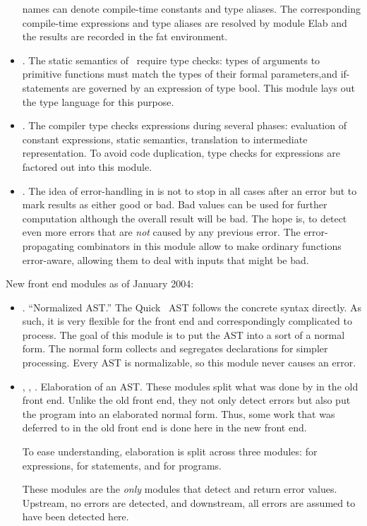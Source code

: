 \documentclass{article}%
\begin{document}
\begin{itemize}
{\PAL} names can denote compile-time constants and type aliases. The
corresponding compile-time expressions and type aliases are resolved by
module {\Tt{}Elab\nwendquote} and the results are recorded in the fat environment.

\item {}. The static semantics of \C~require type
checks:  types of arguments to primitive functions must match the types
of their formal parameters,and {\Tt{}if\nwendquote}-statements are governed by an
expression of type {\Tt{}bool\nwendquote}.  This module lays out the type language for
this purpose.
 
\item {}. The {\qcc} compiler type checks {\AST}
expressions during several phases: evaluation of constant expressions,
static semantics, translation to intermediate representation.  To avoid
code duplication, type checks for expressions are factored out into this
module.

\item {}. The idea of error-handling in {\qcc} is not
to stop in all cases after an error but to mark results as either good
or bad.  Bad values can be used for further computation although the
overall result will be bad.  The hope is, to detect even more errors
that are \textit{not} caused by any previous error. The
error-propagating combinators in this module allow to make ordinary
functions error-aware, allowing them to deal with inputs that might be
bad.

\end{itemize}

New front end modules as of January 2004:
\begin{itemize}
\item
{}.
``Normalized AST.''
The Quick~{\PAL} AST follows the concrete syntax directly.
As such, it is very flexible for the front end and correspondingly
complicated to process.
The goal of this module is to put the AST into a sort of a normal
form.
The normal form collects and segregates declarations for simpler
processing.
Every AST is normalizable, so this module never causes an error.
\item
{},
,
.
Elaboration of an AST.
These modules split what was done by  in the old
front end.
Unlike the old front end, they not only detect errors but also put the
program into an elaborated normal form.
Thus, some work that was deferred to  in the old
front end is done here in the new front end.

To ease understanding, elaboration is split across three modules:
 for expressions,
 for statements,
and 
 for programs.

These modules are the \emph{only} modules that detect and return error values.
Upstream, no errors are detected, and downstream, all errors are
assumed to have been detected here.
\end{itemize}
\end{document}
